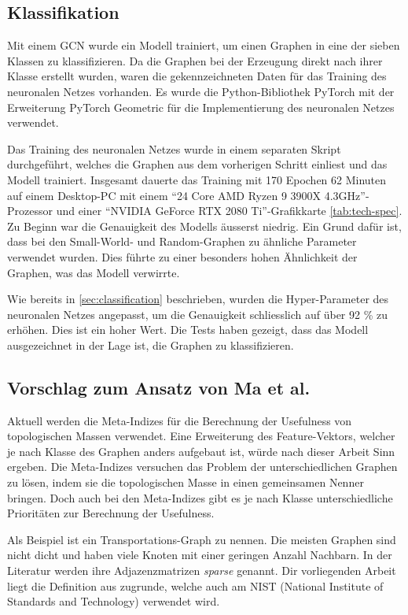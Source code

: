 \subsection{Klassifikation}

Mit einem GCN \cite{kipf_semi-supervised_2017} wurde ein Modell trainiert, um einen Graphen in eine der sieben Klassen zu klassifizieren.
Da die Graphen bei der Erzeugung direkt nach ihrer Klasse erstellt wurden, waren die gekennzeichneten Daten für das Training des neuronalen Netzes vorhanden.
Es wurde die Python-Bibliothek PyTorch \cite{Paszke_PyTorch_An_Imperative_2019} mit der Erweiterung PyTorch Geometric \cite{fey_lenssen_2019} für die Implementierung des neuronalen Netzes verwendet.

Das Training des neuronalen Netzes wurde in einem separaten Skript durchgeführt, welches die Graphen aus dem vorherigen Schritt einliest und das Modell trainiert.
Insgesamt dauerte das Training mit 170 Epochen 62 Minuten auf einem Desktop-PC mit einem \enquote{24 Core AMD Ryzen 9 3900X 4.3GHz}-Prozessor und einer \enquote{NVIDIA GeForce RTX 2080 Ti}-Grafikkarte \ref{tab:tech-spec}.
Zu Beginn war die Genauigkeit des Modells äusserst niedrig. Ein Grund dafür ist, dass bei den Small-World- und Random-Graphen zu ähnliche Parameter verwendet wurden.
Dies führte zu einer besonders hohen Ähnlichkeit der Graphen, was das Modell verwirrte.

Wie bereits in \ref{sec:classification} beschrieben, wurden die Hyper-Parameter des neuronalen Netzes angepasst, um die Genauigkeit schliesslich auf über 92 \% zu erhöhen.
Dies ist ein hoher Wert. Die Tests haben gezeigt, dass das Modell ausgezeichnet in der Lage ist, die Graphen zu klassifizieren.

\subsection{Vorschlag zum Ansatz von Ma et al.}

Aktuell werden die Meta-Indizes für die Berechnung der Usefulness von topologischen Massen verwendet.
Eine Erweiterung des Feature-Vektors, welcher je nach Klasse des Graphen anders aufgebaut ist, würde nach dieser Arbeit Sinn ergeben.
Die Meta-Indizes versuchen das Problem der unterschiedlichen Graphen zu lösen, indem sie die topologischen Masse in einen gemeinsamen Nenner bringen.
Doch auch bei den Meta-Indizes gibt es je nach Klasse unterschiedliche Prioritäten zur Berechnung der Usefulness.

Als Beispiel ist ein Transportations-Graph zu nennen.
Die meisten Graphen sind nicht dicht und haben viele Knoten mit einer geringen Anzahl Nachbarn. In der Literatur werden ihre Adjazenzmatrizen \textit{sparse} genannt.
Dir vorliegenden Arbeit liegt die Definition aus \cite{dads:sg} zugrunde, welche auch am NIST (National Institute of Standards and Technology) verwendet wird.

